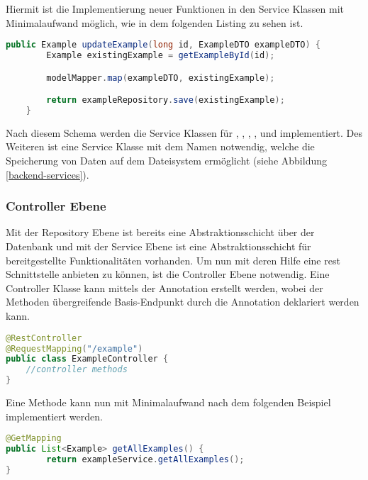 Hiermit ist die Implementierung neuer Funktionen in den Service Klassen mit Minimalaufwand möglich, wie in dem folgenden Listing zu sehen ist.
\begin{lstlisting}[language=Java]
public Example updateExample(long id, ExampleDTO exampleDTO) {
        Example existingExample = getExampleById(id);

        modelMapper.map(exampleDTO, existingExample);

        return exampleRepository.save(existingExample);
    }
\end{lstlisting}

Nach diesem Schema werden die Service Klassen für , , , ,  und  implementiert. Des Weiteren ist eine Service Klasse mit dem Namen  notwendig, welche die Speicherung von Daten auf dem Dateisystem ermöglicht (siehe Abbildung \ref{backend-services}). 

\clearpage


\clearpage

\subsubsection{Controller Ebene}
Mit der Repository Ebene ist bereits eine Abstraktionsschicht über der Datenbank und mit der Service Ebene ist eine Abstraktionsschicht für bereitgestellte Funktionalitäten vorhanden. Um nun mit deren Hilfe eine \gls{rest} Schnittstelle anbieten zu können, ist die Controller Ebene notwendig.
Eine Controller Klasse kann mittels der Annotation  erstellt werden, wobei der Methoden übergreifende Basis-Endpunkt durch die Annotation  deklariert werden kann.
\begin{lstlisting}[language=Java]
@RestController
@RequestMapping("/example")
public class ExampleController {
	//controller methods
}
\end{lstlisting}

Eine Methode kann nun mit Minimalaufwand nach dem folgenden Beispiel implementiert werden.
\begin{lstlisting}[language=Java]
@GetMapping
public List<Example> getAllExamples() {
        return exampleService.getAllExamples();
}
\end{lstlisting}

